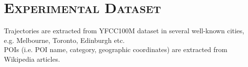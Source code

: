 \documentclass[11pt, a4paper]{article}
\begin{document}
\section{\textsc{Experimental Dataset}}
Trajectories are extracted from YFCC100M dataset in several well-known cities, e.g. Melbourne, Toronto, Edinburgh etc. \\
POIs (i.e. POI name, category, geographic coordinates) are extracted from Wikipedia articles.




\end{document}
